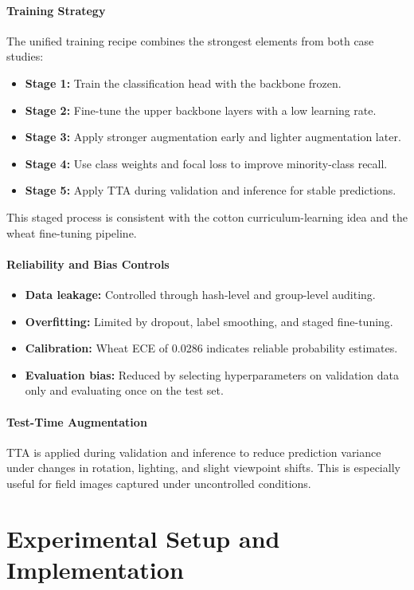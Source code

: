 \documentclass[12pt,a4paper]{report}
\begin{document}
\subsubsection{Training Strategy}
The unified training recipe combines the strongest elements from both case studies:
\begin{itemize}
\item \textbf{Stage 1:} Train the classification head with the backbone frozen.
\item \textbf{Stage 2:} Fine-tune the upper backbone layers with a low learning rate.
\item \textbf{Stage 3:} Apply stronger augmentation early and lighter augmentation later.
\item \textbf{Stage 4:} Use class weights and focal loss to improve minority-class recall.
\item \textbf{Stage 5:} Apply TTA during validation and inference for stable predictions.
\end{itemize}
This staged process is consistent with the cotton curriculum-learning idea and the wheat fine-tuning pipeline.

\subsubsection{Reliability and Bias Controls}
\begin{itemize}
\item \textbf{Data leakage:} Controlled through hash-level and group-level auditing.
\item \textbf{Overfitting:} Limited by dropout, label smoothing, and staged fine-tuning.
\item \textbf{Calibration:} Wheat ECE of 0.0286 indicates reliable probability estimates.
\item \textbf{Evaluation bias:} Reduced by selecting hyperparameters on validation data only and evaluating once on the test set.
\end{itemize}

\subsubsection{Test-Time Augmentation}
TTA is applied during validation and inference to reduce prediction variance under changes in rotation, lighting, and slight viewpoint shifts. This is especially useful for field images captured under uncontrolled conditions.

\chapter{Experimental Setup and Implementation}
\end{document}
